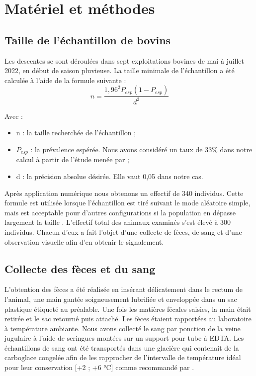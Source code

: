 \section{Matériel et méthodes}
\subsection{Taille de l'échantillon de bovins}
Les descentes se sont déroulées dans sept exploitations bovines de mai à juillet 2022, en 
début de saison pluvieuse. 
La taille minimale de l'échantillon a été calculée à l'aide de la formule suivante 
 :
\begin{equation*}
	n = \frac{1,96^{2}P_{esp}(1 - P_{esp})}{d^{2}}
\end{equation*}

Avec :
\begin{itemize}
\item n : la taille recherchée de l'échantillon ;
\item $P_{esp}$ : la prévalence espérée. Nous avons considéré un taux de 33\% dans notre 
calcul à partir de l'étude menée par ;
\item d : la précision absolue désirée. Elle vaut 0,05 dans notre cas.
\end{itemize}
	
Après application numérique nous obtenons un effectif de 340 individus. Cette formule est 
utilisée lorsque l'échantillon est tiré suivant le mode aléatoire simple, mais est 
acceptable pour d'autres configurations si la population en dépasse largement la 
taille . L'effectif total des animaux examinés s'est élevé à 300 individus. 
Chacun d'eux a fait l'objet d'une collecte de fèces, de sang et d'une observation 
visuelle afin d'en obtenir le signalement. 

\subsection{Collecte des fèces et du sang}
L'obtention des fèces a été réalisée en insérant délicatement dans le rectum de l'animal, 
une main gantée soigneusement lubrifiée et enveloppée dans un sac plastique étiqueté au 
préalable. Une fois les matières fécales saisies, la main était retirée et le sac retourné 
puis attaché. Les fèces étaient rapportées au laboratoire à température ambiante.
Nous avons collecté le sang par ponction de la veine jugulaire à l'aide de seringues 
montées sur un support pour tube à EDTA. Les échantillons de sang ont été transportés 
dans une glacière qui contenait de la carboglace congelée afin de les rapprocher de 
l'intervalle de température idéal pour leur conservation [+2 ; +6 °C] comme recommandé 
par .

